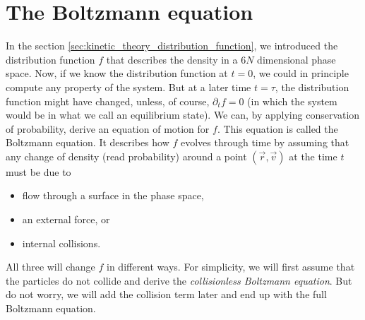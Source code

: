 \section{The Boltzmann equation}
\label{sec:boltzmann_equation}
In the section \ref{sec:kinetic_theory_distribution_function}, we introduced the distribution function $f$ that describes the density in a $6N$ dimensional phase space. Now, if we know the distribution function at $t=0$, we could in principle compute any property of the system. But at a later time $t=\tau$, the distribution function might have changed, unless, of course, $\partial_t f = 0$ (in which the system would be in what we call an equilibrium state). We can, by applying conservation of probability, derive an equation of motion for $f$. This equation is called the Boltzmann equation. It describes how $f$ evolves through time by assuming that any change of density (read probability) around a point $(\vec r, \vec v)$ at the time $t$ must be due to
\begin{itemize}
	\item flow through a surface in the phase space,
	\item an external force, or
	\item internal collisions.
\end{itemize}
All three will change $f$ in different ways. For simplicity, we will first assume that the particles do not collide and derive the \textit{collisionless Boltzmann equation}. But do not worry, we will add the collision term later and end up with the full Boltzmann equation.

